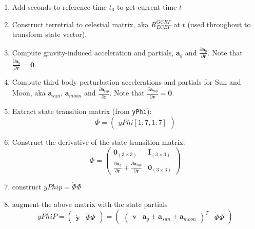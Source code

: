\begin{enumerate}
    \item Add seconds to reference time $t_0$ to get current time $t$
    
    \item Construct terretrial to celestial matrix, aka $R^{GCRF}_{ECEF}$ at 
        $t$ (used throughout to transform state vector).
    
    \item Compute gravity-induced acceleration and partials, $\bm{a}_g$ and 
        $\frac{\partial \bm{a}_g}{\partial \bm{r}}$. Note that 
        $\frac{\partial \bm{a}_g}{\partial \bm{v}} = \bm{0}$.
    
    \item Compute third body perturbation accelerations and partials for 
        Sun and Moon, aka $\bm{a}_{sun}$, $\bm{a}_{moon}$ and 
        $\frac{\partial \bm{a}_{tbp}}{\partial \bm{r}}$. Note that 
        $\frac{\partial \bm{a}_{tbp}}{\partial \bm{v}} = \bm{0}$.
    
    \item Extract state transition matrix (from \texttt{yPhi}):
        \begin{equation}
            \Phi = 
            \begin{pmatrix}
                yPhi[1:7, 1:7]
            \end{pmatrix}
        \end{equation}
    
    \item Construct the derivative of the state transition matrix:
        \begin{equation}
            \dot{\Phi} = 
            \begin{pmatrix}
                \bm{0}_{(3 \times 3)} & \bm{I}_{(3 \times 3)} \\
                \frac{\partial \bm{a}_g}{\partial \bm{r}} + 
                    \frac{\partial \bm{a}_{tbp}}{\partial \bm{r}} & \bm{0}_{(3 \times 3)}
            \end{pmatrix}
        \end{equation}
    
    \item construct $yPhip = \dot{\Phi} \Phi$
    
    \item augment the above matrix with the state partials 
        \begin{equation}
            yPhiP = 
            \begin{pmatrix} 
                \dot{\bm{y}} & \dot{\Phi} \Phi 
            \end{pmatrix}  = 
            \begin{pmatrix} 
                \begin{pmatrix} \bm{v} & \bm{a}_g + \bm{a}_{sun} + \bm{a}_{moon} \end{pmatrix}^T 
                & \dot{\Phi} \Phi
            \end{pmatrix}
        \end{equation}
\end{enumerate}